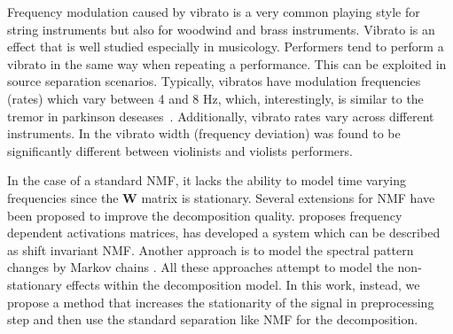 Frequency modulation caused by vibrato is a very common playing style for string instruments but also for woodwind and brass instruments.
Vibrato is an effect that is well studied especially in musicology.
Performers tend to perform a vibrato in the same way when repeating a performance.
This can be exploited in source separation scenarios.
Typically, vibratos have modulation frequencies (rates) which vary between 4 and 8 Hz, which, interestingly, is similar to the tremor in parkinson deseases~\cite{fletcher01}.
Additionally, vibrato rates vary across different instruments.
In \cite{macleod06} the vibrato width (frequency deviation) was found to be significantly different between violinists and violists performers.

In the case of a standard NMF, it lacks the ability to model time varying frequencies since the $\mathbf{W}$ matrix is stationary.
Several extensions for NMF have been proposed to improve the decomposition quality.
\cite{hennequin11} proposes frequency dependent activations matrices, \cite{smaragdis08} has developed a system which can be described as shift invariant NMF.
Another approach is to model the spectral pattern changes by Markov chains \cite{nakano10}. All these approaches attempt to model the non-stationary effects within the decomposition model.
In this work, instead, we propose a method that increases the stationarity of the signal in preprocessing step and then use the standard separation like NMF for the decomposition.\\

